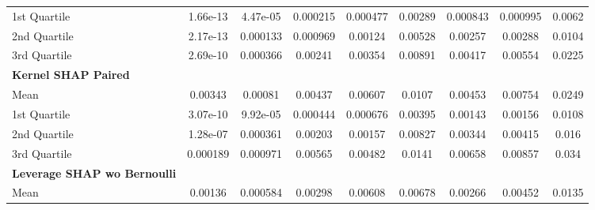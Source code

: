 {\begin{tabular} {lcccccccc}
\hspace{7pt}1st Quartile & \cellcolor{gold!60}1.66e-13 & \cellcolor{gold!60}4.47e-05 & \cellcolor{gold!60}0.000215 & \cellcolor{gold!60}0.000477 & \cellcolor{silver!60}0.00289 & \cellcolor{silver!60}0.000843 & \cellcolor{silver!60}0.000995 & \cellcolor{silver!60}0.0062 \\ 
\hspace{7pt}2nd Quartile & \cellcolor{silver!60}2.17e-13 & \cellcolor{gold!60}0.000133 & \cellcolor{gold!60}0.000969 & \cellcolor{silver!60}0.00124 & \cellcolor{silver!60}0.00528 & \cellcolor{silver!60}0.00257 & \cellcolor{silver!60}0.00288 & \cellcolor{silver!60}0.0104 \\ 
\hspace{7pt}3rd Quartile & \cellcolor{gold!60}2.69e-10 & \cellcolor{gold!60}0.000366 & \cellcolor{gold!60}0.00241 & \cellcolor{gold!60}0.00354 & \cellcolor{gold!60}0.00891 & \cellcolor{silver!60}0.00417 & \cellcolor{silver!60}0.00554 & \cellcolor{silver!60}0.0225 \\ 
\addlinespace[1ex] 
\textbf{Kernel SHAP Paired} &  &  &  &  &  &  &  &  \\ 
\hspace{7pt}Mean & 0.00343 & \cellcolor{bronze!60}0.00081 & \cellcolor{bronze!60}0.00437 & \cellcolor{silver!60}0.00607 & \cellcolor{bronze!60}0.0107 & \cellcolor{bronze!60}0.00453 & \cellcolor{bronze!60}0.00754 & 0.0249 \\ 
\hspace{7pt}1st Quartile & 3.07e-10 & \cellcolor{silver!60}9.92e-05 & \cellcolor{bronze!60}0.000444 & \cellcolor{bronze!60}0.000676 & \cellcolor{bronze!60}0.00395 & \cellcolor{bronze!60}0.00143 & 0.00156 & 0.0108 \\ 
\hspace{7pt}2nd Quartile & \cellcolor{bronze!60}1.28e-07 & \cellcolor{silver!60}0.000361 & \cellcolor{bronze!60}0.00203 & \cellcolor{bronze!60}0.00157 & \cellcolor{bronze!60}0.00827 & \cellcolor{bronze!60}0.00344 & \cellcolor{bronze!60}0.00415 & \cellcolor{bronze!60}0.016 \\ 
\hspace{7pt}3rd Quartile & 0.000189 & \cellcolor{bronze!60}0.000971 & \cellcolor{bronze!60}0.00565 & \cellcolor{bronze!60}0.00482 & \cellcolor{bronze!60}0.0141 & \cellcolor{bronze!60}0.00658 & \cellcolor{bronze!60}0.00857 & 0.034 \\ 
\addlinespace[1ex] 
\textbf{Leverage SHAP wo Bernoulli} &  &  &  &  &  &  &  &  \\ 
\hspace{7pt}Mean & \cellcolor{bronze!60}0.00136 & \cellcolor{silver!60}0.000584 & \cellcolor{silver!60}0.00298 & \cellcolor{bronze!60}0.00608 & \cellcolor{gold!60}0.00678 & \cellcolor{gold!60}0.00266 & \cellcolor{gold!60}0.00452 & \cellcolor{gold!60}0.0135 \\ 

\end{tabular}}
